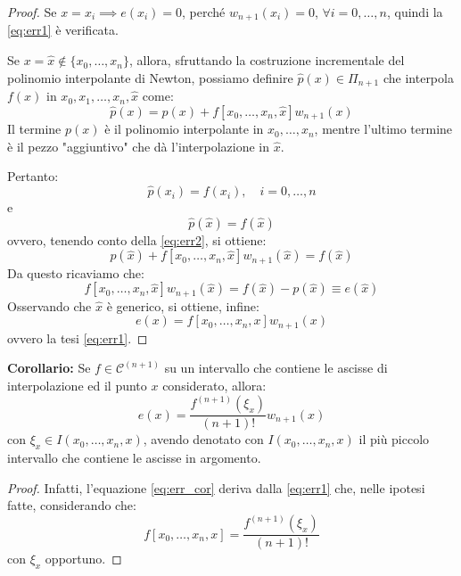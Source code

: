\begin{proof}
Se $x = x_i \implies e(x_i) = 0$, perché $w_{n+1}(x_i) = 0$, $\forall i=0,\dots,n$, quindi la \eqref{eq:err1} è verificata.

Se $x = \hat{x} \notin \{x_0, \dots, x_n\}$, allora, sfruttando la costruzione incrementale del polinomio interpolante di Newton, possiamo definire $\hat{p}(x) \in \Pi_{n+1}$ che interpola $f(x)$ in $x_0, x_1, \dots, x_n, \hat{x}$ come:
\begin{equation} \label{eq:err2}
    \hat{p}(x) = p(x) + f[x_0, \dots, x_n, \hat{x}] w_{n+1}(x)
\end{equation}
Il termine $p(x)$ è il polinomio interpolante in $x_0, \dots, x_n$, mentre l'ultimo termine è il pezzo "aggiuntivo" che dà l'interpolazione in $\hat{x}$.

Pertanto:
$$ \hat{p}(x_i) = f(x_i), \quad i=0, \dots, n $$
e
\begin{equation} \label{eq:err3}
    \hat{p}(\hat{x}) = f(\hat{x})
\end{equation}
ovvero, tenendo conto della \eqref{eq:err2}, si ottiene:
$$ p(\hat{x}) + f[x_0, \dots, x_n, \hat{x}] w_{n+1}(\hat{x}) = f(\hat{x}) $$
Da questo ricaviamo che:
$$ f[x_0, \dots, x_n, \hat{x}] w_{n+1}(\hat{x}) = f(\hat{x}) - p(\hat{x}) \equiv e(\hat{x}) $$
Osservando che $\hat{x}$ è generico, si ottiene, infine:
$$ e(x) = f[x_0, \dots, x_n, x] w_{n+1}(x) $$
ovvero la tesi \eqref{eq:err1}.
\end{proof}

\vspace{0.4cm}
\textbf{Corollario:}
Se $f \in \mathcal{C}^{(n+1)}$ su un intervallo che contiene le ascisse di interpolazione ed il punto $x$ considerato, allora:
\begin{equation} \label{eq:err_cor}
    e(x) = \frac{f^{(n+1)}(\xi_x)}{(n+1)!} w_{n+1}(x)
\end{equation}
con $\xi_x \in I(x_0, \dots, x_n, x)$, avendo denotato con $I(x_0, \dots, x_n, x)$ il più piccolo intervallo che contiene le ascisse in argomento.

\begin{proof}
Infatti, l'equazione \eqref{eq:err_cor} deriva dalla \eqref{eq:err1} che, nelle ipotesi fatte, considerando che:
$$ f[x_0, \dots, x_n, x] = \frac{f^{(n+1)}(\xi_x)}{(n+1)!} $$
con $\xi_x$ opportuno.
\end{proof}

